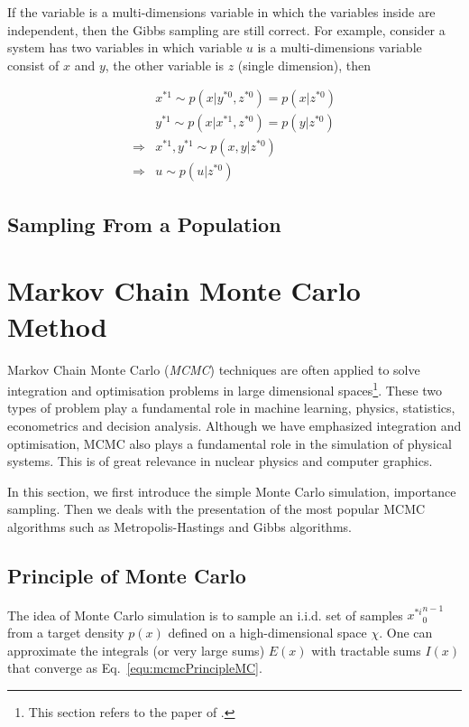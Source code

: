 \documentclass[runningheads,openany]{xhlPaper}
\begin{document}
If the variable is a multi-dimensions variable in which the variables inside are independent, then the Gibbs sampling are still correct.
For example, consider a system has two variables in which variable $u$ is a multi-dimensions variable consist of $x$ and $y$, the other variable is $z$ (single dimension),
then

\begin{displaymath}
\label{equ:gibbs_multi_dimension_proof}
\begin{aligned}
&{x^{*1}} \sim p\left( {x|{y^{*0}},{z^{*0}}} \right) = p\left( {x|{z^{*0}}} \right)\\
&{y^{*1}} \sim p\left( {x|{x^{*1}},{z^{*0}}} \right) = p\left( {y|{z^{*0}}} \right)\\
 \Rightarrow &{x^{*1}},{y^{*1}} \sim p\left( {x,y|{z^{*0}}} \right)\\
 \Rightarrow &u \sim p\left( {u|{z^{*0}}} \right)
\end{aligned}
\end{displaymath}

\subsection{Sampling From a Population}

\section{Markov Chain Monte Carlo Method}
Markov Chain Monte Carlo (\emph{MCMC}) techniques are often applied to solve integration and optimisation problems in large dimensional spaces\footnote{This section refers to the paper of \cite{Introduction_MCMC_Christophe_2003}.}. These two types of problem play a fundamental role in machine learning, physics, statistics, econometrics and decision analysis. Although we have emphasized integration and optimisation, MCMC also plays a fundamental role in the simulation of physical systems. This is of great relevance in nuclear physics and computer graphics.

In this section, we first introduce the simple Monte Carlo simulation, importance sampling. Then we deals with the presentation of the most popular MCMC algorithms such as Metropolis-Hastings and Gibbs algorithms.

\subsection{Principle of Monte Carlo}
The idea of Monte Carlo simulation is to sample an i.i.d. set of samples ${x^{*i}}^{n-1}_{0}$ from a target density $p\left(x\right)$ defined on a high-dimensional space $\chi$. One can approximate the integrals (or very large sums) $E\left(x\right)$ with tractable sums $I\left(x\right)$ that converge as Eq.~\ref{equ:mcmcPrincipleMC}.
\end{document}
